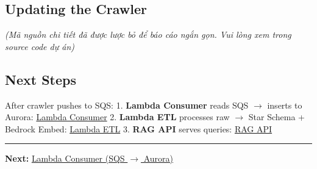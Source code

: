 \hypertarget{updating-the-crawler}{%
\subsection{Updating the Crawler}}

\emph{(Mã nguồn chi tiết đã được lược bỏ để báo cáo ngắn gọn. Vui lòng
xem trong source code dự án)}

\hypertarget{next-steps}{%
\subsection{Next Steps}}

After crawler pushes to SQS: 1. \textbf{Lambda Consumer} reads SQS
\(\rightarrow\) inserts to Aurora: \href{5.11-Lambda-Consumer/}{Lambda
Consumer} 2. \textbf{Lambda ETL} processes raw \(\rightarrow\) Star
Schema + Bedrock Embed: \href{5.12-Lambda-ETL/}{Lambda ETL} 3.
\textbf{RAG API} serves queries: \href{5.13-RAG-API/}{RAG API}

\begin{center}\rule{0.5\linewidth}{0.5pt}\end{center}

\textbf{Next:} \href{5.11-Lambda-Consumer/}{Lambda Consumer (SQS
\(\rightarrow\) Aurora)}

